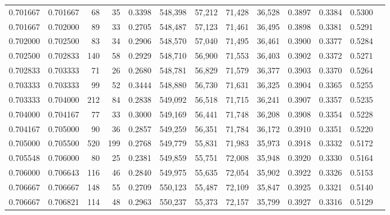 \begin{tabular}{rrrrrrrrrrrrr}
0.701667 & 0.701667 &    68 &  35 &                                     0.3398 & 548,398 &  57,212 &  71,428 &  36,528 & 0.3897 & 0.3384 & 0.5300 \\
0.701667 & 0.702000 &    89 &  33 &                                     0.2705 & 548,487 &  57,123 &  71,461 &  36,495 & 0.3898 & 0.3381 & 0.5291 \\
0.702000 & 0.702500 &    83 &  34 &                                     0.2906 & 548,570 &  57,040 &  71,495 &  36,461 & 0.3900 & 0.3377 & 0.5284 \\
0.702500 & 0.702833 &   140 &  58 &                                     0.2929 & 548,710 &  56,900 &  71,553 &  36,403 & 0.3902 & 0.3372 & 0.5271 \\
0.702833 & 0.703333 &    71 &  26 &                                     0.2680 & 548,781 &  56,829 &  71,579 &  36,377 & 0.3903 & 0.3370 & 0.5264 \\
0.703333 & 0.703333 &    99 &  52 &                                     0.3444 & 548,880 &  56,730 &  71,631 &  36,325 & 0.3904 & 0.3365 & 0.5255 \\
0.703333 & 0.704000 &   212 &  84 &                                     0.2838 & 549,092 &  56,518 &  71,715 &  36,241 & 0.3907 & 0.3357 & 0.5235 \\
0.704000 & 0.704167 &    77 &  33 &                                     0.3000 & 549,169 &  56,441 &  71,748 &  36,208 & 0.3908 & 0.3354 & 0.5228 \\
0.704167 & 0.705000 &    90 &  36 &                                     0.2857 & 549,259 &  56,351 &  71,784 &  36,172 & 0.3910 & 0.3351 & 0.5220 \\
0.705000 & 0.705500 &   520 & 199 &                                     0.2768 & 549,779 &  55,831 &  71,983 &  35,973 & 0.3918 & 0.3332 & 0.5172 \\
0.705548 & 0.706000 &    80 &  25 &                                     0.2381 & 549,859 &  55,751 &  72,008 &  35,948 & 0.3920 & 0.3330 & 0.5164 \\
0.706000 & 0.706643 &   116 &  46 &                                     0.2840 & 549,975 &  55,635 &  72,054 &  35,902 & 0.3922 & 0.3326 & 0.5153 \\
0.706667 & 0.706667 &   148 &  55 &                                     0.2709 & 550,123 &  55,487 &  72,109 &  35,847 & 0.3925 & 0.3321 & 0.5140 \\
0.706667 & 0.706821 &   114 &  48 &                                     0.2963 & 550,237 &  55,373 &  72,157 &  35,799 & 0.3927 & 0.3316 & 0.5129 \\

\end{tabular}
